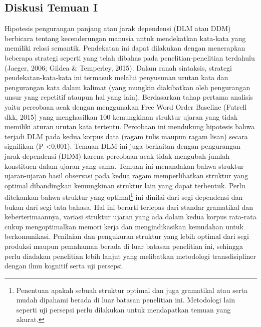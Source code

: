 \subsection{Diskusi Temuan I}
Hipotesis pengurangan panjang atau jarak dependensi (DLM atau DDM) berbicara tentang kecenderungan manusia untuk mendekatkan kata-kata yang memiliki relasi semantik. Pendekatan ini dapat dilakukan dengan menerapkan beberapa strategi seperti yang telah dibahas pada penelitian-penelitian terdahulu (Jaeger, 2006; Gildea & Temperley, 2015). Dalam ranah sintaksis, strategi pendekatan-kata-kata ini termasuk melalui penyusunan urutan kata dan pengurangan kata dalam kalimat (yang mungkin diakibatkan oleh pengurangan unsur yang repetitif ataupun hal yang lain). Berdasarkan tahap pertama analisis yaitu percobaan acak dengan menggunakan Free Word Order Baseline (Futrell dkk, 2015) yang menghasilkan 100 kemungkinan struktur ujaran yang tidak memiliki aturan urutan kata tertentu. Percobaan ini mendukung hipotesis bahwa terjadi DLM pada kedua korpus data (ragam tulis maupun ragam lisan) secara signifikan (P \textless 0,001). Temuan DLM ini juga berkaitan dengan pengurangan jarak dependensi (DDM) karena percobaan acak tidak mengubah jumlah konstituen dalam ujaran yang sama. Temuan ini menandakan bahwa struktur ujaran-ujaran hasil observasi pada kedua ragam memperlihatkan struktur yang optimal dibandingkan kemungkinan struktur lain yang dapat terbentuk. Perlu ditekankan bahwa struktur yang optimal\footnote{Penentuan apakah sebuah struktur optimal dan juga gramatikal atau serta mudah dipahami berada di luar batasan penelitian ini. Metodologi lain seperti uji persepsi perlu dilakukan untuk mendapatkan temuan yang akurat.} ini dinilai dari segi dependensi dan bukan dari segi tata bahasa. Hal ini berarti terlepas dari standar gramatikal dan keberterimaannya, variasi struktur ujaran yang ada dalam kedua korpus rata-rata cukup mengoptimalkan memori kerja dan mengindikasikan kemudahan untuk berkomunikasi. Penilaian dan pengukuran struktur yang lebih optimal dari segi produksi maupun pemahaman berada di luar batasan penelitian ini, sehingga perlu diadakan penelitian lebih lanjut yang melibatkan metodologi transdisipliner dengan ilmu kognitif serta uji persepsi.

